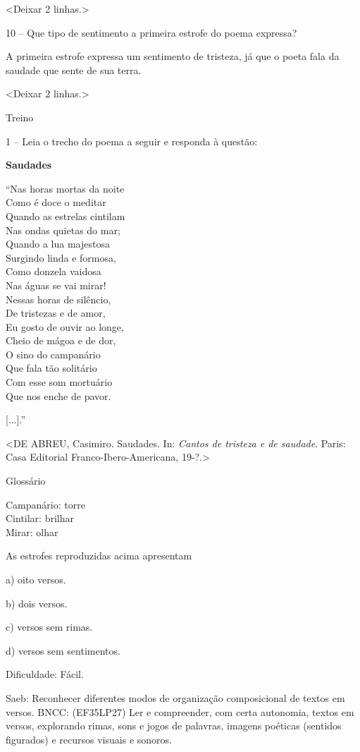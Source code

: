\textless{}Deixar 2 linhas.\textgreater{}

10 -- Que tipo de sentimento a primeira estrofe do poema expressa?

A primeira estrofe expressa um sentimento de tristeza, já que o poeta
fala da saudade que sente de sua terra.

\textless{}Deixar 2 linhas.\textgreater{}

Treino

1 -- Leia o trecho do poema a seguir e responda à questão:

\textbf{Saudades}

``Nas horas mortas da noite\\
Como é doce o meditar\\
Quando as estrelas cintilam\\
Nas ondas quietas do mar;\\
Quando a lua majestosa\\
Surgindo linda e formosa,\\
Como donzela vaidosa\\
Nas águas se vai mirar!\\[2\baselineskip]Nessas horas de silêncio,\\
De tristezas e de amor,\\
Eu gosto de ouvir ao longe,\\
Cheio de mágoa e de dor,\\
O sino do campanário\\
Que fala tão solitário\\
Com esse som mortuário\\
Que nos enche de pavor.

{[}...{]}.''

\textless{}DE ABREU, Casimiro. Saudades. In: \emph{Cantos de tristeza e
de saudade}. Paris: Casa Editorial Franco-Ibero-Americana,
19-?.\textgreater{}

Glossário

Campanário: torre\\
Cintilar: brilhar\\
Mirar: olhar

As estrofes reproduzidas acima apresentam

a) oito versos.

b) dois versos.

c) versos sem rimas.

d) versos sem sentimentos.

Dificuldade: Fácil.

Saeb: Reconhecer diferentes modos de organização composicional de textos
em versos. BNCC: (EF35LP27) Ler e compreender, com certa autonomia,
textos em versos, explorando rimas, sons e jogos de palavras, imagens
poéticas (sentidos figurados) e recursos visuais e sonoros.

